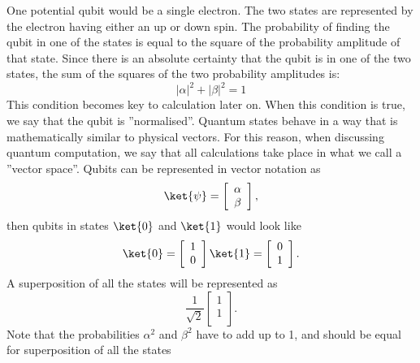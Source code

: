 \documentclass[12pt]{report}
\begin{document}
 One potential qubit would be a single electron. The two states are represented by the electron having either an up or down spin.
The probability of finding the qubit in one of the states is equal to the square of the probability amplitude of that state. Since there is an absolute certainty that the qubit is in one of the two states, the sum of the squares of the two probability amplitudes is:
\begin{equation}
\label{eq:qubit}
|\alpha|^2 + |\beta|^2 = 1
\end{equation}
This condition becomes key to calculation later on. When this condition is true, we say that the qubit is ''normalised''.
Quantum states behave in a way that is mathematically similar to physical vectors. For this reason, when discussing quantum computation, we say that all calculations take place in what we call a ''vector space''. Qubits can be represented in vector notation as
\begin{equation}
\ket{\psi} = 
\left[
\begin{array}{c}
\alpha \\
\beta \\
\end{array}
\right],
\end{equation}
then qubits in states $\ket{0}$ and $\ket{1}$ would look like 
\begin{equation}
\ket{0} = 
\left[
\begin{array}{c}
1 \\
0 \\
\end{array}
\right]
\ket{1} = 
\left[
\begin{array}{c}
0 \\
1 \\
\end{array}
\right].
\end{equation}
A superposition of all the states will be represented as
\begin{equation}
\frac{1}{\sqrt{2}}
\left[
\begin{array}{c}
1 \\
1 \\
\end{array}
\right].
\end{equation}
Note that the probabilities $\alpha^2$ and $\beta^2$ have to add up to 1, and should be equal for superposition of all the states
\end{document}
